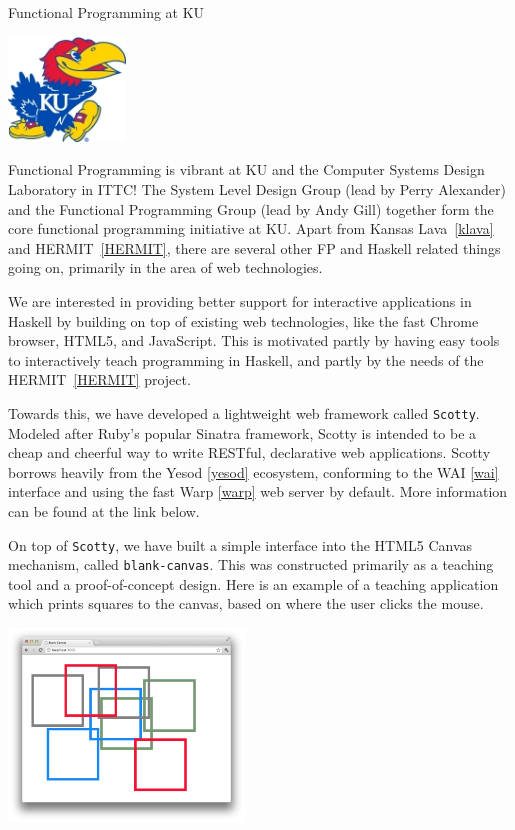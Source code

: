 \begin{hcarentry}{Functional Programming at KU}
\label{ukansas}
\makeheader

\begin{center}
\includegraphics[width=0.235\textwidth]{html/jh2.jpg}
\end{center}

Functional Programming is vibrant at KU and 
the Computer Systems Design Laboratory in ITTC!
The System Level Design Group (lead by Perry Alexander)
and the Functional Programming Group (lead by Andy Gill)
together form the core functional programming initiative at KU.
Apart from Kansas Lava~\cref{klava} and HERMIT~\cref{HERMIT},
there are several other
FP and Haskell related things going on,
primarily in the area of web technologies.

We are interested in providing better support for
interactive applications in Haskell by building on top of existing web technologies,
like the fast Chrome browser, HTML5, and JavaScript. This is motivated
partly by having easy tools to interactively teach programming in Haskell,
and partly by the needs of the HERMIT~\cref{HERMIT} project.

Towards this, we have developed a lightweight web framework called {\tt Scotty}.
Modeled after Ruby's popular Sinatra framework, Scotty is intended to
be a cheap and cheerful way to write RESTful, declarative web applications.
Scotty borrows heavily from the Yesod \cref{yesod} ecosystem, conforming
to the WAI \cref{wai} interface and using the fast Warp \cref{warp} web server
by default. More information can be found at the link below.

On top of {\tt Scotty}, we have built a simple interface
into the HTML5 Canvas mechanism, called {\tt blank-canvas}.
This was constructed primarily as a teaching tool and
a proof-of-concept design. Here is an example of
a teaching application which prints squares to the canvas,
based on where the user clicks the mouse.

\begin{center}
\includegraphics[width=0.47\textwidth]{html/squares.png}
\end{center}


\end{hcarentry}
